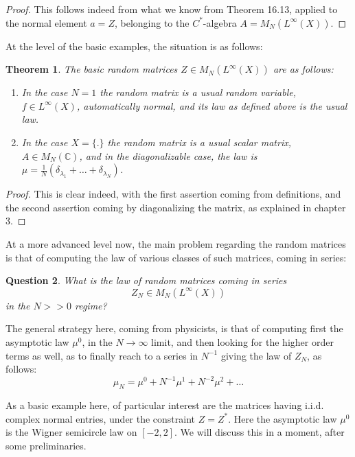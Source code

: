 \documentclass[12pt]{amsbook}
\newtheorem{theorem}{Theorem}[chapter]
\newtheorem{question}[theorem]{Question}
\begin{document}
\begin{proof}
This follows indeed from what we know from Theorem 16.13, applied to the normal element $a=Z$, belonging to the $C^*$-algebra $A=M_N(L^\infty(X))$. 
\end{proof}

At the level of the basic examples, the situation is as follows:

\begin{theorem}
The basic random matrices $Z\in M_N(L^\infty(X))$ are as follows:
\begin{enumerate}
\item In the case $N=1$ the random matrix is a usual random variable, $f\in L^\infty(X)$, automatically normal, and its law as defined above is the usual law.

\item In the case $X=\{.\}$ the random matrix is a usual scalar matrix, $A\in M_N(\mathbb C)$, and in the diagonalizable case, the law is $\mu=\frac{1}{N}\left(\delta_{\lambda_1}+\ldots+\delta_{\lambda_N}\right)$.
\end{enumerate}
\end{theorem}

\begin{proof}
This is clear indeed, with the first assertion coming from definitions, and the second assertion coming by diagonalizing the matrix, as explained in chapter 3.
\end{proof}

At a more advanced level now, the main problem regarding the random matrices is that of computing the law of various classes of such matrices, coming in series:

\begin{question}
What is the law of random matrices coming in series
$$Z_N\in M_N(L^\infty(X))$$
in the $N>>0$ regime?
\end{question}

The general strategy here, coming from physicists, is that of computing first the asymptotic law $\mu^0$, in the $N\to\infty$ limit, and then looking for the higher order terms as well, as to finally reach to a series in $N^{-1}$ giving the law of $Z_N$, as follows: 
$$\mu_N=\mu^0+N^{-1}\mu^1+N^{-2}\mu^2+\ldots$$

As a basic example here, of particular interest are the matrices having i.i.d. complex normal entries, under the constraint $Z=Z^*$. Here the asymptotic law $\mu^0$ is the Wigner semicircle law on $[-2,2]$. We will discuss this in a moment, after some preliminaries.
\end{document}
